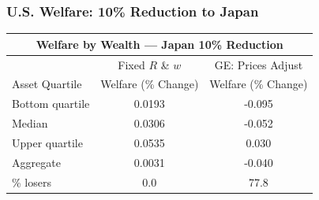 \documentclass[9pt,pdftex,aspectratio=1610]{beamer}
\theoremstyle{definition}
\begin{document}
\begin{frame}[t]
\frametitle{U.S. Welfare: 10\% Reduction to Japan}
\begin{table}[t]
\footnotesize
\setlength {\tabcolsep}{6.05mm}
\renewcommand{\arraystretch}{1.80}
\begin{center}
\begin{tabular}{l c c}
\multicolumn{3}{c}{\small \textbf{Welfare by Wealth --- Japan {\color{red} 10\%} Reduction}}\\
\hline
\hline
& \footnotesize  Fixed $R$ \& $w$ & GE: Prices Adjust \\
\cmidrule(lr){2-2}  \cmidrule(lr){3-3}
\footnotesize  Asset Quartile & \footnotesize  Welfare (\% Change) & \footnotesize  Welfare (\% Change) \\
\footnotesize  Bottom quartile  & 0.0193 & -0.095 \\
\footnotesize  Median & 0.0306 & -0.052 \\
\footnotesize  Upper quartile  & 0.0535 & 0.030  \\
\footnotesize  Aggregate & 0.0031 & -0.040 \\
\cmidrule(lr){2-2}  \cmidrule(lr){3-3}
\footnotesize  \% losers & 0.0 & 77.8\\
\hline
\end{tabular}
\end{center}
\end{table}
\end{frame}


%
\end{document}

